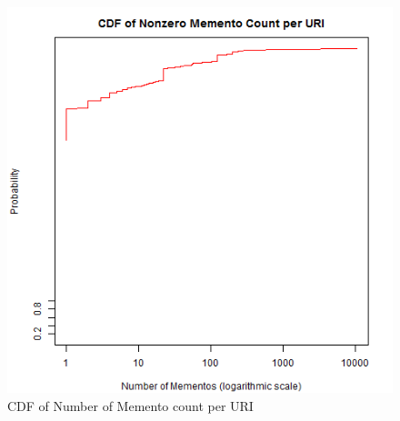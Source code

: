 \begin{figure}[ht]
	\begin{center}
		 \includegraphics[scale=0.60]{mementocounts.png}
		  \caption{CDF of Number of Memento count per URI}
	 \end{center}
\end{figure}
\newpage
